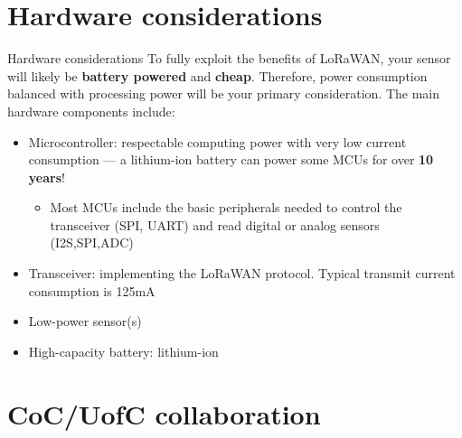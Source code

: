 \documentclass{beamer}
\begin{document}
\section{Hardware considerations}
    
    \begin{frame}{Hardware considerations}
        To fully exploit the benefits of LoRaWAN, your sensor will likely be {\bf battery powered} and {\bf cheap}. Therefore, power consumption balanced with processing power will be your primary consideration.
        \vfill 
        The main hardware components include:
        \begin{itemize}
            \item Microcontroller: respectable computing power with very low current consumption --- a lithium-ion battery can power some MCUs for over {\bf 10 years}!
            \begin{itemize}
                \item Most MCUs include the basic peripherals needed to control the transceiver (SPI, UART) and read digital or analog sensors (I2S,SPI,ADC) 
            \end{itemize}
            \item Transceiver: implementing the LoRaWAN protocol. Typical transmit current consumption is 125mA
            \item Low-power sensor(s)
            \item High-capacity battery: lithium-ion
        \end{itemize}
    \end{frame}
    
\section{CoC/UofC collaboration}
    
\end{document}
